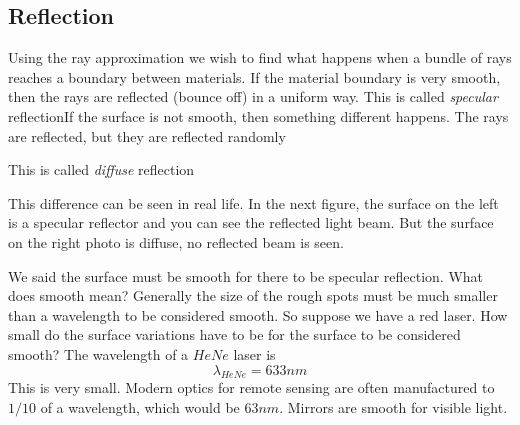 \documentclass{article}
\begin{document}
\subsection{Reflection}

Using the ray approximation we wish to find what happens when a bundle of
rays reaches a boundary between materials. If the material boundary is very
smooth, then the rays are reflected (bounce off) in a uniform way. This is
called \emph{specular }reflectionIf the surface is not smooth,
then something different happens. The rays are reflected, but they are
reflected randomly

This is called \emph{diffuse}
reflection

This difference can be seen in real life. In the next figure, the surface on
the left is a specular reflector and you can see the reflected light beam.
But the surface on the right photo is diffuse, no reflected beam is seen.%

We said the surface must be smooth for there to be specular reflection. What
does smooth mean? Generally the size of the rough spots must be much smaller
than a wavelength to be considered smooth. So suppose we have a red laser.
How small do the surface variations have to be for the surface to be
considered smooth? The wavelength of a $HeNe$ laser is 
\[
\lambda _{HeNe}=633\unit{nm}
\]%
This is very small. Modern optics for remote sensing are often manufactured
to $1/10$ of a wavelength, which would be $63\unit{nm}.$ Mirrors are smooth
for visible light.
\end{document}
